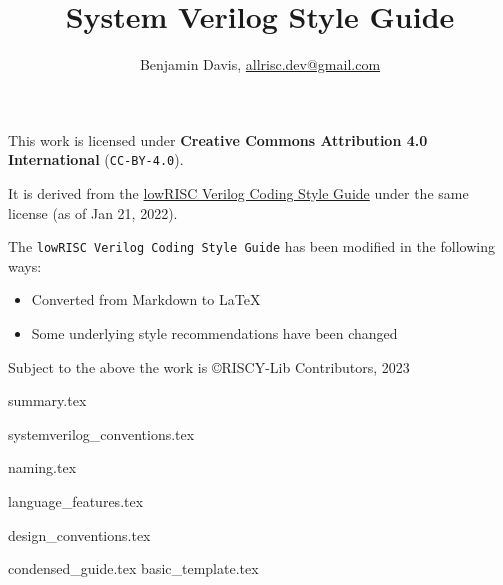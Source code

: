 \documentclass[12pt]{report}
\title{System Verilog Style Guide}
\author{Benjamin Davis, \href{mailto:allrisc.dev@gmail.com}{allrisc.dev@gmail.com}}
\begin{document}
  \pagestyle{title}
  \maketitle

  \newpage

  \vspace*{\fill}
  \begin{center}
    This work is licensed under \textbf{Creative Commons Attribution 4.0 International} (\texttt{CC-BY-4.0}).

    It is derived from the \href{https://github.com/lowRISC/style-guides/blob/master/VerilogCodingStyle.md}{lowRISC Verilog Coding Style Guide}
      under the same license (as of Jan 21, 2022).

    The \texttt{lowRISC Verilog Coding Style Guide} has been modified in the following ways:
    \begin{itemize}
      \item Converted from Markdown to LaTeX
      \item Some underlying style recommendations have been changed
    \end{itemize}

    Subject to the above the work is \copyright RISCY-Lib Contributors, 2023
  \end{center}
  \vspace*{\fill}

  \pagestyle{plain}
  \tableofcontents

  {summary.tex}

  {systemverilog_conventions.tex}

  {naming.tex}

  {language_features.tex}

  {design_conventions.tex}

  \appendix

  {condensed_guide.tex}
  {basic_template.tex}
\end{document}
